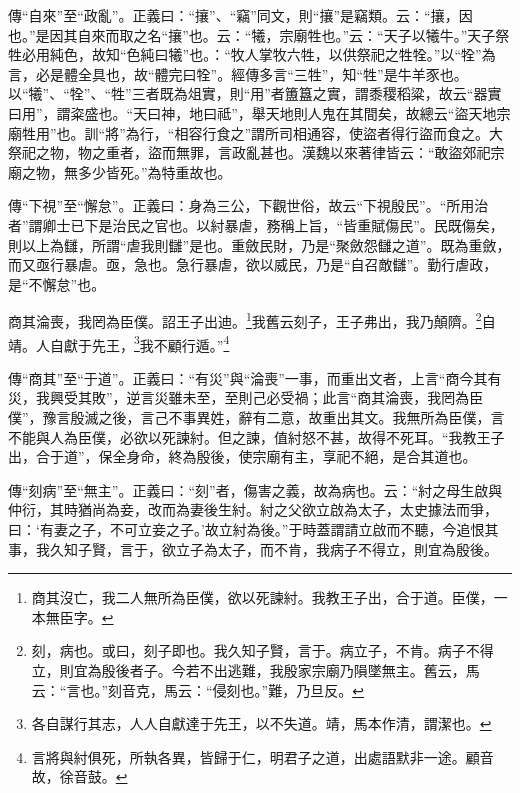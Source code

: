 {\noindent\zhuan{}\fzbyks 傳“自來”至“政亂”。正義曰：“攘”、“竊”同文，則“攘”是竊類。云：“攘，因也。”是因其自來而取之名“攘”也。云：“犧，宗廟牲也。”云：“天子以犧牛。”天子祭牲必用純色，故知“色純曰犧”也。：“牧人掌牧六牲，以供祭祀之牲牷。”以“牷”為言，必是體全具也，故“體完曰牷”。經傳多言“三牲”，知“牲”是牛羊豕也。以“犧”、“牷”、“牲”三者既為俎實，則“用”者簠簋之實，謂黍稷稻粱，故云“器實曰用”，謂粢盛也。“天曰神，地曰祗”，舉天地則人鬼在其間矣，故總云“盜天地宗廟牲用”也。訓“將”為行，“相容行食之”謂所司相通容，使盜者得行盜而食之。大祭祀之物，物之重者，盜而無罪，言政亂甚也。漢魏以來著律皆云：“敢盜郊祀宗廟之物，無多少皆死。”為特重故也。 \par}

{\noindent\zhuan{}\fzbyks 傳“下視”至“懈怠”。正義曰：身為三公，下觀世俗，故云“下視殷民”。“所用治者”謂卿士已下是治民之官也。以紂暴虐，務稱上旨，“皆重賦傷民”。民既傷矣，則以上為讎，所謂“虐我則讎”是也。重斂民財，乃是“聚斂怨讎之道”。既為重斂，而又亟行暴虐。亟，急也。急行暴虐，欲以威民，乃是“自召敵讎”。勤行虐政，是“不懈怠”也。 \par}

商其淪喪，我罔為臣僕。詔王子出迪。\footnote{商其沒亡，我二人無所為臣僕，欲以死諫紂。我教王子出，合于道。臣僕，一本無臣字。}我舊云刻子，王子弗出，我乃顛隮。\footnote{刻，病也。或曰，刻子即也。我久知子賢，言于。病立子，不肯。病子不得立，則宜為殷後者子。今若不出逃難，我殷家宗廟乃隕墜無主。舊云，馬云：“言也。”刻音克，馬云：“侵刻也。”難，乃旦反。}自靖。人自獻于先王，\footnote{各自謀行其志，人人自獻達于先王，以不失道。靖，馬本作清，謂潔也。}我不顧行遁。”\footnote{言將與紂俱死，所執各異，皆歸于仁，明君子之道，出處語默非一途。顧音故，徐音鼓。}

{\noindent\zhuan{}\fzbyks 傳“商其”至“于道”。正義曰：“有災”與“淪喪”一事，而重出文者，上言“商今其有災，我興受其敗”，逆言災雖未至，至則己必受禍；此言“商其淪喪，我罔為臣僕”，豫言殷滅之後，言己不事異姓，辭有二意，故重出其文。我無所為臣僕，言不能與人為臣僕，必欲以死諫紂。但之諫，值紂怒不甚，故得不死耳。“我教王子出，合于道”，保全身命，終為殷後，使宗廟有主，享祀不絕，是合其道也。 \par}

{\noindent\zhuan{}\fzbyks 傳“刻病”至“無主”。正義曰：“刻”者，傷害之義，故為病也。云：“紂之母生啟與仲衍，其時猶尚為妾，改而為妻後生紂。紂之父欲立啟為太子，太史據法而爭，曰：‘有妻之子，不可立妾之子。’故立紂為後。”于時蓋謂請立啟而不聽，今追恨其事，我久知子賢，言于，欲立子為太子，而不肯，我病子不得立，則宜為殷後。 \par}

